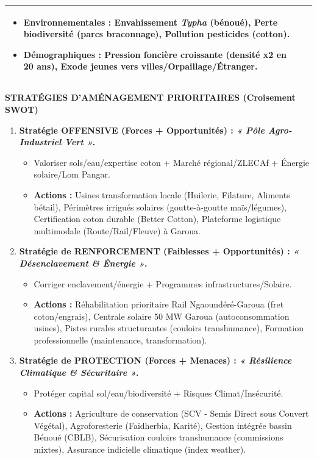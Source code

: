 \documentclass[11pt]{article}
\begin{document}
\begin{exoresolu}
\begin{center}
\begin{tabularx}{\linewidth}{|X|X|}
\begin{itemize}
    \item \textbf{Environnementales :} Envahissement \emph{Typha} (bénoué), Perte biodiversité (parcs braconnage), Pollution pesticides (cotton).
    \item \textbf{Démographiques :} Pression foncière croissante (densité x2 en 20 ans), Exode jeunes vers villes/Orpaillage/Étranger.
\end{itemize} \\ \hline
\end{tabularx}
\end{center}

\textbf{STRATÉGIES D'AMÉNAGEMENT PRIORITAIRES (Croisement SWOT)}

\begin{enumerate}
    \item \textbf{Stratégie OFFENSIVE (Forces + Opportunités) : \emph{« Pôle Agro-Industriel Vert »}.}
    \begin{itemize}
        \item Valoriser sols/eau/expertise coton + Marché régional/ZLECAf + Énergie solaire/Lom Pangar.
        \item \textbf{Actions :} Usines transformation locale (Huilerie, Filature, Aliments bétail), Périmètres irrigués solaires (goutte-à-goutte maïs/légumes), Certification coton durable (Better Cotton), Plateforme logistique multimodale (Route/Rail/Fleuve) à Garoua.
    \end{itemize}
    \item \textbf{Stratégie de RENFORCEMENT (Faiblesses + Opportunités) : \emph{« Désenclavement \& Énergie »}.}
    \begin{itemize}
        \item Corriger enclavement/énergie + Programmes infrastructures/Solaire.
        \item \textbf{Actions :} Réhabilitation prioritaire Rail Ngaoundéré-Garoua (fret coton/engrais), Centrale solaire 50 MW Garoua (autoconsommation usines), Pistes rurales structurantes (couloirs transhumance), Formation professionnelle (maintenance, transformation).
    \end{itemize}
    \item \textbf{Stratégie de PROTECTION (Forces + Menaces) : \emph{« Résilience Climatique \& Sécuritaire »}.}
    \begin{itemize}
        \item Protéger capital sol/eau/biodiversité + Risques Climat/Insécurité.
        \item \textbf{Actions :} Agriculture de conservation (SCV - Semis Direct sous Couvert Végétal), Agroforesterie (Faïdherbia, Karité), Gestion intégrée bassin Bénoué (CBLB), Sécurisation couloirs transhumance (commissions mixtes), Assurance indicielle climatique (index weather).

\end{itemize}
\end{enumerate}
\end{exoresolu}
\end{document}
